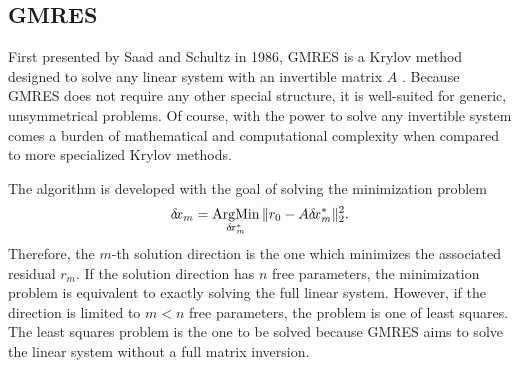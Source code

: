\documentclass[12pt]{../UWMadThesis}
\begin{document}
\subsection{GMRES}
First presented by Saad and Schultz in 1986, GMRES is a Krylov method designed to solve any linear system with an invertible matrix $A$ \cite{saad_gmres_1986}.
Because GMRES does not require any other special structure, it is well-suited for generic, unsymmetrical problems.
Of course, with the power to solve any invertible system comes a burden of mathematical and computational complexity when compared to more specialized Krylov methods.

The algorithm is developed with the goal of solving the minimization problem
\begin{equation}
    \delta \mkern-3.00mu x_m = \operatorname*{ArgMin}_{\delta \mkern-3.00mu x_m^*} \|r_0 - A \delta \mkern-3.00mu x_m^*\|_2^2.
    \label{Eqn:GMRESMinimization}
\end{equation}
Therefore, the $m$-th solution direction is the one which minimizes the associated residual $r_m$.
If the solution direction has $n$ free parameters, the minimization problem is equivalent to exactly solving the full linear system.
However, if the direction is limited to $m < n$ free parameters, the problem is one of least squares.
The least squares problem is the one to be solved because GMRES aims to solve the linear system without a full matrix inversion.
\end{document}

